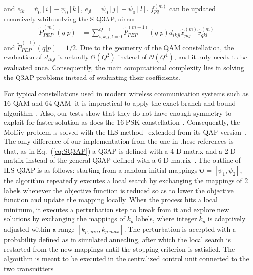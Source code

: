 \documentclass[journal]{IEEEtran}
\begin{document}
and $e_{ik} = \psi_0[i] - \psi_0[k]$, $e_{jl} = \psi_0[j] - \psi_0[l]$.
$f_{pq}^{(m)}$ can be updated recursively while solving the S-Q3AP, since:
\begin{align}
  \tilde{P}_{PEP}^{(m)}(q|p) & =
  \sum_{i,k,j,l=0}^{Q-1}\tilde{P}_{PEP}^{(m-1)}(q|p)d_{ikjl}
  \hat{x}_{pij}^{(m)}\hat{x}_{qkl}^{(m)}
  \label{eq:pep_update}
\end{align}
and $ \tilde{P}_{PEP}^{(-1)}(q|p) = 1/2$. Due to the geometry
of the QAM constellation, the evaluation of $d_{ikjl}$ is actually $\mathcal{O}(Q^2)$ instead of $\mathcal{O}(Q^4)$, and
it only needs to be evaluated once. Consequently, the main computational
complexity lies in solving the Q3AP problems instead of evaluating their
coefficients.

For typical constellations used in modern wireless communication systems such as
16-QAM and 64-QAM, it is impractical to apply the exact branch-and-bound
algorithm~\cite{hahn2008quadratic}. Also, our tests show that they do not have
enough symmetry to exploit for faster solution as does the 16-PSK
constellation~\cite{mittelmann2015solving}.
Consequently, the MoDiv problem is solved with the ILS
method~\cite[Sec. 5.5]{hahn2008quadratic} extended from its QAP
version~\cite{stutzle2006iterated}. The only difference of our
implementation from the one in these references is that, as in
Eq.~(\ref{eq:SQ3AP}) a Q3AP is defined with a 4-D matrix and a 2-D matrix
instead of the general Q3AP defined with a 6-D
matrix~\cite[Eq.(2)]{hahn2008quadratic}. The outline of ILS-Q3AP is as
follows: starting from a random initial mappings $\bm{\psi}=[\psi_1,
\psi_2]$, the algorithm repeatedly executes a local search by exchanging the
mappings of 2 labels whenever the objective function is reduced so as to lower
the objective function and update the mapping locally. When the process hits a
local minimum, it executes a perturbation step to break from it and explore new
solutions by exchanging the mappings of $k_p$ labels, where integer $k_p$ is
adaptively adjusted within a range $[k_{p,min}, k_{p,max}]$. The perturbation is
accepted with a probability defined as in simulated annealing, after which the
local search is restarted from the new mappings until the stopping criterion is
satisfied. The algorithm is meant to be executed in the centralized control
unit connected to the two transmitters.
\end{document}
